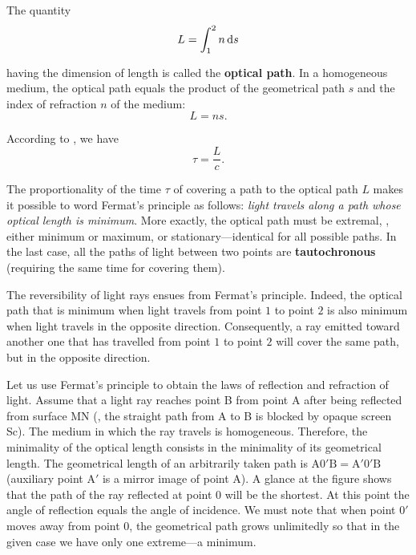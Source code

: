 The quantity
\begin{equation}\label{eq:16_52}
    L = \int_1^2 n\, \mathrm{d} s
\end{equation}

\noindent
having the dimension of length is called the \textbf{optical path}.
In a homogeneous medium, the optical path equals the product of the geometrical path $s$ and the index of refraction $n$ of the medium:
\begin{equation}\label{eq:16_53}
    L = ns.
\end{equation}

According to , we have
\begin{equation}\label{eq:16_54}
    \tau = \frac{L}{c}.
\end{equation}

\noindent
The proportionality of the time $\tau$ of covering a path to the optical path $L$ makes it possible to word Fermat's principle as follows: \textit{light travels along a path whose optical length is minimum}.
More exactly, the optical path must be extremal, \ie, either minimum or maximum, or stationary---identical for all possible paths.
In the last case, all the paths of light between two points are \textbf{tautochronous} (requiring the same time for covering them).

The reversibility of light rays ensues from Fermat's principle.
Indeed, the optical path that is minimum when light travels from point $1$ to point $2$ is also minimum when light travels in the opposite direction.
Consequently, a ray emitted toward another one that has travelled from point $1$ to point $2$ will cover the same path, but in the opposite direction.

Let us use Fermat's principle to obtain the laws of reflection and refraction of light.
Assume that a light ray reaches point B from point A after being reflected from surface MN (, the straight path from A to B is blocked by opaque screen Sc).
The medium in which the ray travels is homogeneous.
Therefore, the minimality of the optical length consists in the minimality of its geometrical length.
The geometrical length of an arbitrarily taken path is $\text{A}0'\text{B}=\text{A}'0'\text{B}$ (auxiliary point A$'$ is a mirror image of point A).
A glance at the figure shows that the path of the ray reflected at point $0$ will be the shortest.
At this point the angle of reflection equals the angle of incidence.
We must note that when point $0'$ moves away from point $0$, the geometrical path grows unlimitedly so that in the given case we have only one extreme---a minimum.

